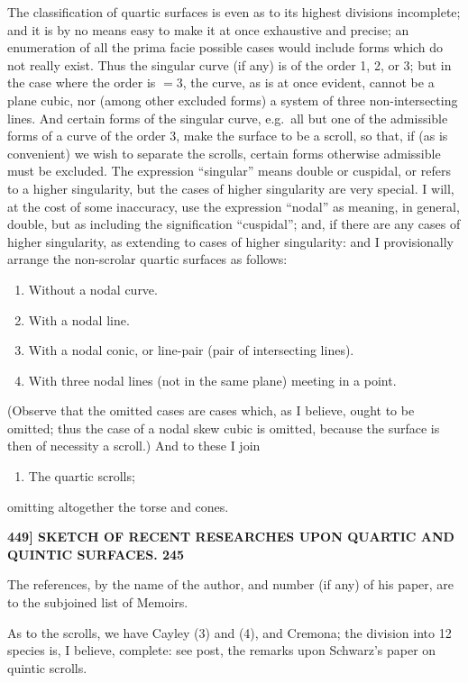 \documentclass[11pt]{article}
\begin{document}
The classification of quartic surfaces is even as to its highest divisions incomplete;
and it is by no means easy to make it at once exhaustive and precise; an enumera\-tion of all the prima facie possible cases would include forms which do not really
exist. Thus the singular curve (if any) is of the order 1, 2, or 3; but in the case
where the order is $=3$, the curve, as is at once evident, cannot be a plane cubic,
nor (among other excluded forms) a system of three non-intersecting lines. And certain
forms of the singular curve, e.g.\ all but one of the admissible forms of a curve of
the order 3, make the surface to be a scroll, so that, if (as is convenient) we wish to
separate the scrolls, certain forms otherwise admissible must be excluded. The expression
``singular'' means double or cuspidal, or refers to a higher singularity, but the cases
of higher singularity are very special. I will, at the cost of some inaccuracy, use the
expression ``nodal'' as meaning, in general, double, but as including the signification
``cuspidal''; and, if there are any cases of higher singularity, as extending to cases of
higher singularity: and I provisionally arrange the non-scrolar quartic surfaces as follows:
\begin{enumerate}
\item[1.] Without a nodal curve.
\item[2.] With a nodal line.
\item[3.] With a nodal conic, or line-pair (pair of intersecting lines).
\item[4.] With three nodal lines (not in the same plane) meeting in a point.
\end{enumerate}
(Observe that the omitted cases are cases which, as I believe, ought to be omitted;
thus the case of a nodal skew cubic is omitted, because the surface is then of necessity
a scroll.) And to these I join
\begin{enumerate}
\item[5.] The quartic scrolls;
\end{enumerate}
omitting altogether the torse and cones.

\medskip
\noindent\textbf{449] \quad SKETCH OF RECENT RESEARCHES UPON QUARTIC AND QUINTIC SURFACES. \hfill 245}

\medskip

The references, by the name of the author, and number (if any) of his paper, are
to the subjoined list of Memoirs.

As to the scrolls, we have Cayley (3) and (4), and Cremona; the division into
12 species is, I believe, complete: see post, the remarks upon Schwarz's paper on
quintic scrolls.
\end{document}
